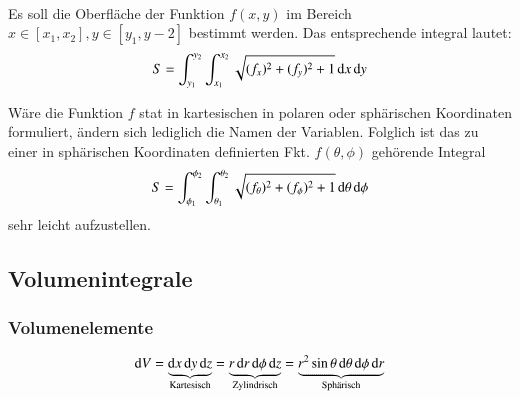 \\
Es soll die Oberfläche der Funktion $ f(x, y) $ im Bereich $ x \in [x_1, x_2], y \in [y_1, y-2] $ bestimmt werden.
Das entsprechende integral lautet:
$$ S = \int_{y_1}^{y_2} \int_{x_1}^{x_2} \sqrt{(f_{x})^2 + (f_{y})^2 + 1} \mathop{} \! \mathrm{d} x \mathop{} \! \mathrm{d} y $$

Wäre die Funktion $f$ stat in kartesischen in polaren oder sphärischen Koordinaten formuliert, ändern sich lediglich die Namen der Variablen. 
Folglich ist das zu einer in sphärischen Koordinaten definierten Fkt. $f(\theta, \phi)$ gehörende Integral
$$ S = \int_{\phi_1}^{\phi_2} \int_{\theta_1}^{\theta_2} \sqrt{(f_{\theta})^2 + (f_{\phi})^2 + 1} \mathop{} \! \mathrm{d} \theta \mathop{} \! \mathrm{d} \phi $$
sehr leicht aufzustellen.

\subsection{Volumenintegrale}
\subsubsection{Volumenelemente}
$$ 
 \diff V 
    = \underbrace{\diff x \diff y \diff z}_{\text{Kartesisch}}
    = \underbrace{r \diff r \diff \phi \diff z}_{\text{Zylindrisch}}
    = \underbrace{r^2 \sin \theta \diff \theta \diff \phi \diff r}_{\text{Sphärisch}}
$$

